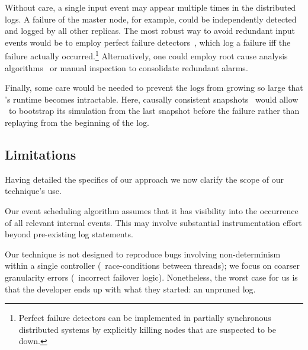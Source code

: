 Without care, a single input event may appear multiple times in the
distributed logs. A failure of the master node, for example, could be independently
detected and logged by all other replicas. The most robust way to
avoid redundant input events would be to employ perfect failure
detectors~\cite{chandra1996unreliable}, which log a failure iff
the failure actually occurred.\footnote{Perfect failure detectors can be
implemented in partially synchronous distributed systems by explicitly killing
nodes that are suspected to be down.} %
Alternatively, one
could employ root cause analysis
algorithms~\cite{yemini1996} or manual inspection to consolidate redundant
alarms.

Finally, some care would be needed to prevent the logs from growing so large that
\simulator's runtime becomes intractable. Here, causally consistent
snapshots~\cite{Chandy:1985:DSD:214451.214456} would allow \projectname~to
bootstrap its simulation from the last snapshot before the failure rather than
replaying from the beginning of the log.

\subsection{Limitations}
\label{subsec:non_goals}

Having detailed the specifics of our approach we now
clarify the scope of our technique's use.

 Our event scheduling algorithm assumes that
it has visibility into the occurrence of all relevant internal events. This
may involve substantial instrumentation effort beyond
pre-existing log statements.

 Our technique is not designed to reproduce bugs
involving non-determinism within a single controller (\eg~race-conditions between threads);
we focus on coarser granularity errors (\eg~incorrect failover logic). Nonetheless, the
worst case for us is that the developer ends up with what they started:
an unpruned log.


